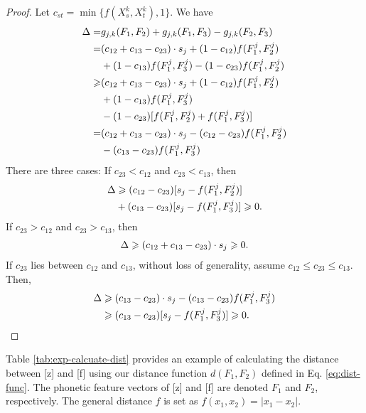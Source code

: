 \begin{proof}
    Let $c_{st}=\min\{f(X_s^k,X_t^k),1\}$. We have
    \begin{equation}
    \begin{aligned}
        \setlen
        \Delta=& g_{j,k}(F_1,F_2)+g_{j,k}(F_1,F_3)- g_{j,k}(F_2,F_3)\\
        =&(c_{12}+c_{13}-c_{23})\cdot s_j+(1-c_{12}) f(F_1^j,F_2^j)\\
        & +(1-c_{13}) f(F_1^j,F_3^j)-(1-c_{23}) f(F_1^j,F_2^j)\\
        \geqslant &(c_{12}+c_{13}-c_{23})\cdot s_j+(1-c_{12}) f(F_1^j,F_2^j)\\
        & +(1-c_{13})f(F_1^j,F_3^j) \\
        & -(1-c_{23})[f(F_1^j,F_2^j)+f(F_1^j,F_3^j)]\\
        = &(c_{12}+c_{13}-c_{23}) \cdot s_j-(c_{12}-c_{23}) f(F_1^j,F_2^j)\\
        & -(c_{13}-c_{23}) f(F_1^j,F_3^j)  \label{eq:need-simplify}
    \end{aligned}
    \end{equation}
    There are three cases: If $c_{23}<c_{12}$ and $c_{23}<c_{13}$, then
    \begin{equation*}
    \begin{aligned}
    \setlen
    \Delta & \geqslant (c_{12}-c_{23})[s_j - f(F_1^j,F_2^j)]\\
    & +(c_{13} - c_{23})[s_j-f(F_1^j,F_3^j)] \geqslant 0.
    \end{aligned}
    \end{equation*}
    If $c_{23}>c_{12}$ and $c_{23}>c_{13}$, then
    \begin{equation*}
    \begin{aligned}
    \setlen
     \Delta
        \geqslant (c_{12}+c_{13}-c_{23})\cdot s_j \geqslant0.
    \end{aligned}
    \end{equation*}
    If $c_{23}$ lies between $c_{12}$ and $c_{13}$, without loss of generality, assume $c_{12}\leqslant c_{23}\leqslant c_{13}$. Then,
    \begin{equation*}
    \begin{aligned}
    \setlen
        \Delta
        & \geqslant (c_{13}-c_{23})\cdot s_j-(c_{13}-c_{23}) f(F_1^j,F_3^j)\\
        & \geqslant( c_{13}-c_{23})[s_j-f(F_1^j,F_3^j)]\geqslant0.
    \end{aligned}
    \end{equation*}
\end{proof}


Table \ref{tab:exp-calcuate-dist} provides an example of calculating the distance between [z] and [f] using our distance function $d(F_1, F_2)$ defined in Eq. \ref{eq:dist-func}. The phonetic feature vectors of [z] and [f] are denoted $F_1$ and $F_2$, respectively. The general distance $f$ is set as $f(x_1, x_2)=|x_1-x_2|$.